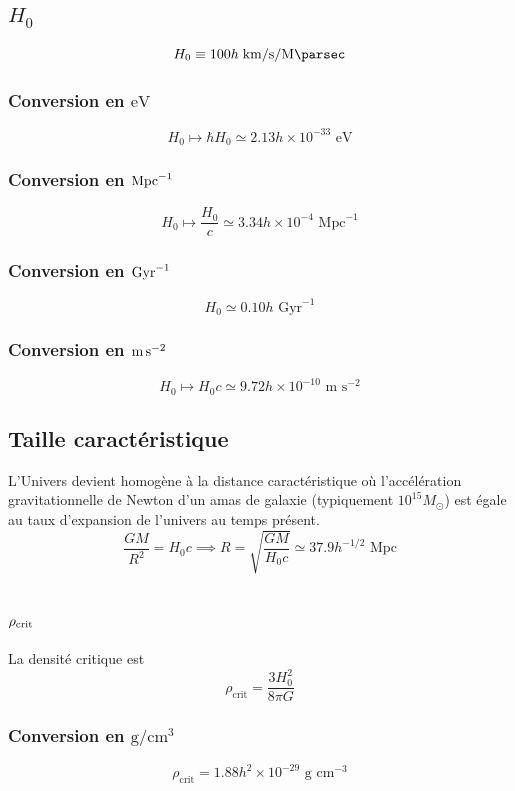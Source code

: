 \documentclass{article}
\numberwithin{equation}{section}
\newcommand{\s}{\hspace{0.1cm}}
\begin{document}
\subsection{$H_0$}
\[
        H_0 \equiv 100 h \s \si{\kilo\meter \per \second \per \mega \parsec}
\]
\subsubsection{Conversion en $\si{\electronvolt}$}
\[
        H_0 \mapsto \hbar H_0 \simeq 2.13h \times 10^{-33}\,\, \si{\electronvolt}
\]

\subsubsection{Conversion en $\textmd{Mpc}^{-1}$}\label{sec:TailleUnivers}
\[
        H_0 \mapsto \frac{H_0}{c} \simeq 3.34h \times 10^{-4} \,\, \text{Mpc}^{-1}
\]
\subsubsection{Conversion en $\textmd{Gyr}^{-1}$}
\[
        H_0 \simeq 0.10h \,\, \text{Gyr}^{-1}
\]

\subsubsection{Conversion en $\textmd{m}\, \textmd{s}^{-2}$}
\[
        H_0 \mapsto H_0 c \simeq 9.72h \times 10^{-10}\,\, \text{m}\,\,\text{s}^{-2}
\]

\subsection{Taille caractéristique}
L'Univers devient homogène à la distance caractéristique où l'accélération gravitationnelle de Newton 
d'un amas de galaxie (typiquement $10^{15} M_\odot$) 
est égale au taux d'expansion de l'univers au temps présent. 
\[
        \frac{GM}{R^2} = H_0 c \implies R = \sqrt{\frac{GM}{H_0 c}} \simeq 37.9h^{-1/2} \,\, \text{Mpc}
\]

\subsection{$\rho_{\textmd{crit}}$}
La densité critique est
\[
        \rho_{\text{crit}} = \frac{3 H_0^2}{8 \pi G}
\]

\subsubsection{Conversion en $\si{\gram \per\centi\meter^{3}}$}
\[
        \rho_{\text{crit}} = 1.88h^{2} \times 10^{-29}\,\, \text{g} \,\, \text{cm}^{-3}
\]
\end{document}
